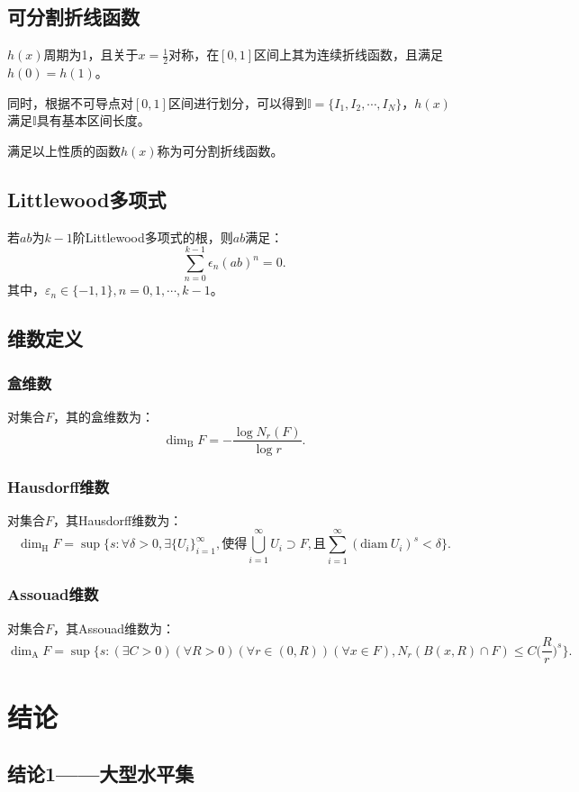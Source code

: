\subsection{可分割折线函数}

$h(x)$周期为1，且关于$x=\frac{1}{2}$对称，在$[0,1]$区间上其为连续折线函数，且满足$h(0)=h(1)$。

同时，根据不可导点对$[0,1]$区间进行划分，可以得到$\mathbb{I}=\{I_1,I_2,\cdots,I_N\}$，$h(x)$满足$\mathbb{I}$具有基本区间长度。

满足以上性质的函数$h(x)$称为可分割折线函数。

\subsection{Littlewood多项式}
若$ab$为$k-1$阶Littlewood多项式的根，则$ab$满足：
$$
      \sum_{n=0}^{k-1}\epsilon_n(ab)^n=0.
$$
其中，$\varepsilon_n\in\{-1,1\},n=0,1,\cdots,k-1$。

\subsection{维数定义}
\subsubsection{盒维数}
对集合$F$，其的盒维数为：
$$
      \mathrm{\dim_B}F=-\frac{\log N_r(F)}{\log r}.
$$

\subsubsection{Hausdorff维数}
对集合$F$，其Hausdorff维数为：
$$
      \mathrm{\dim_H}F=\sup\{s:\forall\delta>0,\exists\{U_i\}_{i=1}^\infty,\mbox{使得}\bigcup_{i=1}^\infty U_i\supset F,\mbox{且}\sum_{i=1}^\infty (\mathrm{diam}~U_i)^s<\delta\}.
$$

\subsubsection{Assouad维数}
对集合$F$，其Assouad维数为：
$$
      \mathrm{\dim_A}F=\sup\{s:(\exists C>0)(\forall R>0)(\forall r\in(0,R))(\forall x\in F),N_r(B(x,R)\cap F)\le C\Big(\frac{R}{r}\Big)^s\}.
$$

\section{结论}

\subsection{结论1——大型水平集}

